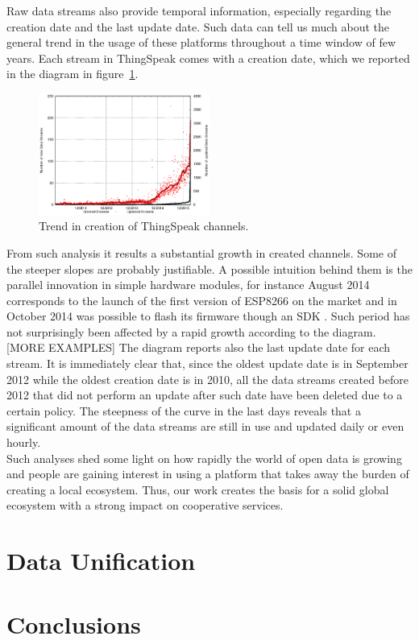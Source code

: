 \documentclass[conference]{IEEEtran}
\begin{document}
Raw data streams also provide temporal information, especially regarding the creation date and the last update date.
Such data can tell us much about the general trend in the usage of these platforms throughout a time window of few years.
Each stream in ThingSpeak comes with a creation date, which we reported in the diagram in figure~\ref{creationtrend}.
\begin{figure}[!t]
\centering
\includegraphics[width=0.50\textwidth]{img/bars.eps} 
\caption{Trend in creation of ThingSpeak channels.}
\label{creationtrend}
\end{figure}
From such analysis it results a substantial growth in created channels.
Some of the steeper slopes are probably justifiable.
A possible intuition behind them is the parallel innovation in simple hardware modules, for instance August 2014 corresponds to the launch of the first version of ESP8266 on the market and in October 2014 was possible to flash its firmware though an SDK \cite{espressif}.
Such period has not surprisingly been affected by a rapid growth according to the diagram. [MORE EXAMPLES]
The diagram reports also the last update date for each stream.
It is immediately clear that, since the oldest update date is in September 2012 while the oldest creation date is in 2010, all the data streams created before 2012 that did not perform an update after such date have been deleted due to a certain policy.
The steepness of the curve in the last days reveals that a significant amount of the data streams are still in use and updated daily or even hourly.
\\

Such analyses shed some light on how rapidly the world of open data is growing and people are gaining interest in using a platform that takes away the burden of creating a local ecosystem.
Thus, our work creates the basis for a solid global ecosystem with a strong impact on cooperative services.


\section{Data Unification}
\label{unification}

\section{Conclusions}







\end{document}

